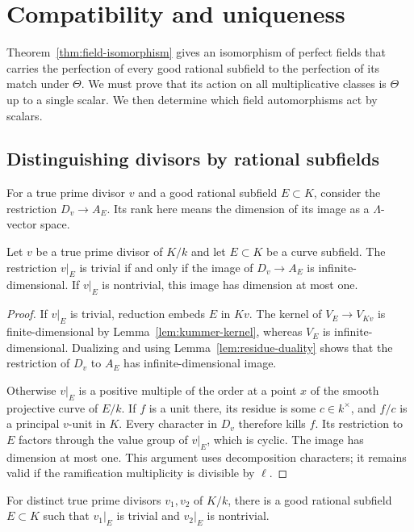 \section{Compatibility and uniqueness}\label{sec:compatibility}

Theorem~\ref{thm:field-isomorphism} gives an isomorphism of perfect fields
that carries the perfection of every good rational subfield to the
perfection of its match under $\Theta$. We must prove that its action on all multiplicative classes is
$\Theta$ up to a single scalar. We then determine which field
automorphisms act by scalars.

\subsection{Distinguishing divisors by rational subfields}

For a true prime divisor $v$ and a good rational subfield $E\subset K$,
consider the restriction $D_v\to A_E$. Its rank here means the dimension
of its image as a $\Lambda$-vector space.

\begin{lemma}\label{lem:restriction-rank}
Let $v$ be a true prime divisor of $K/k$ and let $E\subset K$ be a curve
subfield. The restriction $v|_E$ is trivial if and only if the image of
$D_v\to A_E$ is infinite-dimensional. If $v|_E$ is nontrivial, this image
has dimension at most one.
\end{lemma}

\begin{proof}
If $v|_E$ is trivial, reduction embeds $E$ in $Kv$. The kernel of
$V_E\to V_{Kv}$ is finite-dimensional by Lemma~\ref{lem:kummer-kernel},
whereas $V_E$ is infinite-dimensional. Dualizing and using
Lemma~\ref{lem:residue-duality} shows that the restriction of $D_v$ to
$A_E$ has infinite-dimensional image.

Otherwise $v|_E$ is a positive multiple of the order at a point $x$ of
the smooth projective curve of $E/k$. If $f$ is a unit there, its residue
is some $c\in k^\times$, and $f/c$ is a principal $v$-unit in $K$.
Every character in $D_v$ therefore kills $f$. Its restriction to $E$
factors through the value group of $v|_E$, which is cyclic. The image
has dimension at most one. This argument uses decomposition characters;
it remains valid if the ramification multiplicity is divisible by $\ell$.
\end{proof}

\begin{lemma}\label{lem:separate-divisors}
For distinct true prime divisors $v_1,v_2$ of $K/k$, there is a good
rational subfield $E\subset K$ such that $v_1|_E$ is trivial and
$v_2|_E$ is nontrivial.
\end{lemma}

